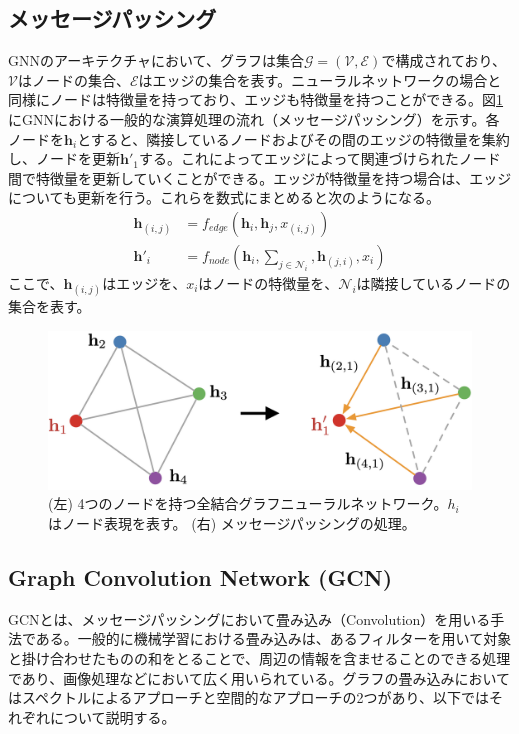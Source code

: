 \subsection{メッセージパッシング}
GNNのアーキテクチャにおいて、グラフは集合$\mathcal{G} = (\mathcal{V}, \mathcal{E})$で構成されており、$\mathcal{V}$はノードの集合、$\mathcal{E}$はエッジの集合を表す。ニューラルネットワークの場合と同様にノードは特徴量を持っており、エッジも特徴量を持つことができる。図\ref{messagepass}にGNNにおける一般的な演算処理の流れ（メッセージパッシング）を示す。各ノードを$\mathbf{h}_i$とすると、隣接しているノードおよびその間のエッジの特徴量を集約し、ノードを更新$\mathbf{h}'_1$する。これによってエッジによって関連づけられたノード間で特徴量を更新していくことができる。エッジが特徴量を持つ場合は、エッジについても更新を行う。これらを数式にまとめると次のようになる。
\begin{align}
\mathbf{h}_{(i,j)} &= f_{edge}(\mathbf{h}_i, \mathbf{h}_j, x_{(i, j)})\\
\mathbf{h}'_i &= f_{node}(\mathbf{h}_i, \sum_{j\in \mathcal{N}_i}, \mathbf{h}_{(j, i)}, x_i)
\label{gnnm}
\end{align}
ここで、$\mathbf{h}_{(i,j)}$はエッジを、$x_i$はノードの特徴量を、$\mathcal{N}_i$は隣接しているノードの集合を表す。
\begin{figure}[H]
	\begin{center}
 \includegraphics[keepaspectratio, scale=0.25]
 	{Figure/Deeplearning/messagepassing.png}
 		\caption{ (左) 4つのノードを持つ全結合グラフニューラルネットワーク。$h_i$はノード表現を表す。 (右) メッセージパッシングの処理。}
 		\label{messagepass}
	\end{center}
\end{figure}
\subsection{Graph Convolution Network (GCN)}
GCNとは、メッセージパッシングにおいて畳み込み（Convolution）を用いる手法である。一般的に機械学習における畳み込みは、あるフィルターを用いて対象と掛け合わせたものの和をとることで、周辺の情報を含ませることのできる処理であり、画像処理などにおいて広く用いられている。グラフの畳み込みにおいてはスペクトルによるアプローチと空間的なアプローチの2つがあり、以下ではそれぞれについて説明する。
